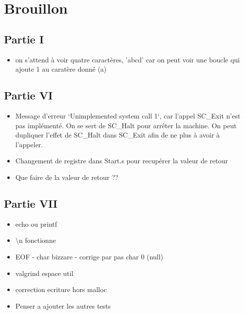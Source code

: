 \documentclass{article}
\begin{document}
\section{Brouillon}
\subsection{Partie I}
\begin{itemize}
    \item on s'attend à voir quatre caractères, 'abcd' car on peut voir une boucle qui ajoute 1 au caratère donné (a)

    
\end{itemize}



\subsection{Partie VI}
\begin{itemize}
    \item Message d'erreur `Unimplemented system call 1`, car l'appel SC\_Exit n'est pas implémenté. On se sert de SC\_Halt pour arrêter la machine.
    On peut dupliquer l'effet de SC\_Halt dans SC\_Exit afin de ne plus à avoir à l'appeler.
    \item Changement de registre dans Start.s pour recupérer la valeur de retour
    \item Que faire de la valeur de retour ??
\end{itemize}

\subsection{Partie VII}
\begin{itemize}
    \item echo ou printf
    \item \textbackslash n fonctionne
    \item EOF - char bizzare - corrige par pas char 0 (null)
    \item valgrind espace util 
    \item correction ecriture hors malloc
    \item Penser a ajouter les autres tests
\end{itemize}
\end{document}
